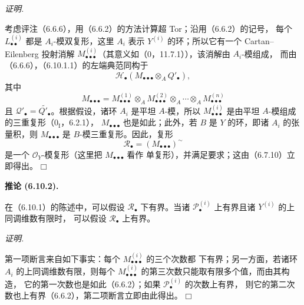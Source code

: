 \documentclass[UTF8,fontset=none,11pt,oneside,openany]{ctexbook}
\providecommand{\square}{\mdlgwhtsquare}
\newenvironment{corollary}[1][]{%
  \par\medskip\noindent\textbf{推论 (#1).}\ %
}{\par}
\newenvironment{proof}{%
  \par\smallskip\noindent\textit{证明.}\ %
}{\hfill$\square$\par}
\newcommand{\oldpage}[2][]{%
  \hypertarget{ega-source-page-#1-#2}{}%
  \marginnote{\scriptsize\textbf{#1}~|~#2}\ignorespaces}
\begin{document}
\begin{proof}
\oldpage[III]{172}
考虑评注（6.6.6），用（6.6.2）的方法计算超 Tor；沿用（6.6.2）的记号，
每个 $L_{\bullet\bullet}^{(i)}$ 都是 $A_i$-模双复形，这里 $A_i$ 表示
$Y^{(i)}$ 的环；所以它有一个 Cartan--Eilenberg 投射消解
$M_{\bullet\bullet\bullet}^{(i)}$（其意义如（0，11.7.1）），该消解由
$A_i$-模组成，
而由（6.6.6），（6.10.1.1）的左端典范同构于
\[
  \mathscr H_\bullet
  (M_{\bullet\bullet\bullet}\otimes_A Q'_\bullet),
\]
其中
\[
  M_{\bullet\bullet\bullet}
  =
  M_{\bullet\bullet\bullet}^{(1)}
  \otimes_A M_{\bullet\bullet\bullet}^{(2)}
  \otimes_A\cdots\otimes_A M_{\bullet\bullet\bullet}^{(n)}
\]
且 $\mathscr Q'_\bullet=\widetilde{Q'_\bullet}$。根据假设，诸环
$A_i$ 是平坦 $A$-模，所以 $M_{\bullet\bullet\bullet}^{(i)}$ 是由平坦
$A$-模组成的三重复形（$0_{\mathrm I}$，6.2.1），
$M_{\bullet\bullet\bullet}$ 也是如此；此外，若 $B$ 是 $Y$ 的环，即诸
$A_i$ 的张量积，则 $M_{\bullet\bullet\bullet}$ 是 $B$-模三重复形。因此，复形
\[
  \mathscr R_\bullet=(M_{\bullet\bullet\bullet})^\sim
\]
是一个 $\mathscr O_Y$-模复形（这里把 $M_{\bullet\bullet\bullet}$ 看作
单复形），并满足要求；这由（6.7.10）立即得出。
\end{proof}

\begin{corollary}[6.10.2]
在（6.10.1）的陈述中，可以假设 $\mathscr R_\bullet$ 下有界。当诸
$\mathscr P_\bullet^{(i)}$ 上有界且诸 $Y^{(i)}$ 的上同调维数有限时，
可以假设 $\mathscr R_\bullet$ 上有界。
\end{corollary}

\begin{proof}
第一项断言来自如下事实：每个 $M_{\bullet\bullet\bullet}^{(i)}$ 的三个次数都
下有界；另一方面，若诸环 $A_i$ 的上同调维数有限，则每个
$M_{\bullet\bullet\bullet}^{(i)}$ 的第三次数只能取有限多个值，而由其构造，
它的第一次数也是如此（6.6.2）；如果 $\mathscr P_\bullet^{(i)}$ 的次数上有界，
则它的第二次数也上有界（6.6.2），第二项断言立即由此得出。
\end{proof}
\end{document}
